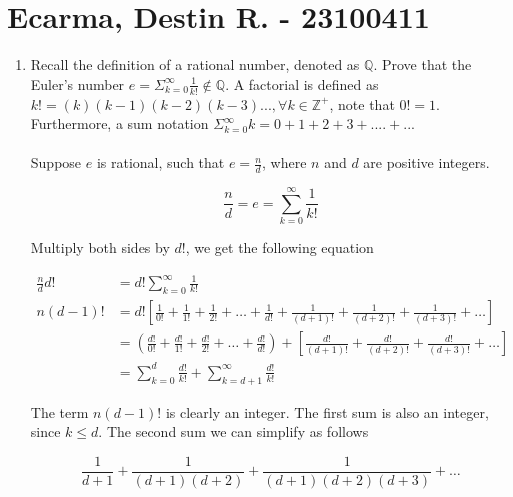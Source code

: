 \documentclass{article}
\begin{document}
\section*{Ecarma, Destin R. - 23100411}
\boldmath

\begin{enumerate}
	\item Recall the definition of a rational number, denoted as $\mathbb{Q}$. Prove that the Euler's number $e = \Sigma_{k=0}^\infty \frac{1}{k!} \notin \mathbb{Q}$. A factorial is defined as $k! = (k)(k-1)(k-2)(k-3)..., \forall k \in \mathbb{Z}^+$, note that $0! = 1$. Furthermore, a sum notation $\Sigma_{k=0}^\infty k = 0+ 1 + 2 + 3 +....+...$
	      \\~\\
	      Suppose $e$ is rational, such that $e = \frac{n}{d}$, where $n$ and $d$ are positive integers.

	      \begin{equation}
		      \frac{n}{d} = e = \sum_{k=0}^{\infty} \frac{1}{k!}
	      \end{equation}

	      Multiply both sides by $d!$, we get the following equation

	      \begin{equation}
		      \begin{split}
			      \frac{n}{d}d! & = d!\sum_{k=0}^{\infty} \frac{1}{k!}                                                                                                                                         \\
			      n(d - 1)!     & = d! \left[\frac{1}{0!} + \frac{1}{1!} + \frac{1}{2!} + \dots + \frac{1}{d!} + \frac{1}{(d+1)!} + \frac{1}{(d+2)!} + \frac{1}{(d+3)!} + \dots \right]                        \\
			                    & = \left(\frac{d!}{0!} + \frac{d!}{1!} + \frac{d!}{2!} + \dots + \frac{d!}{d!}\right) + \left[\frac{d!}{(d + 1)!}  + \frac{d!}{(d + 2)!} + \frac{d!}{(d + 3)!} + \dots\right] \\
			                    & = \sum_{k=0}^{d} \frac{d!}{k!} + \sum_{k=d+1}^{\infty} \frac{d!}{k!}
		      \end{split}
	      \end{equation}

	      The term $n(d - 1)!$ is clearly an integer. The first sum is also an integer, since $k \leq d$. The second sum we can simplify as follows

	      \begin{equation}
		      \frac{1}{d+1} + \frac{1}{(d+1)(d+2)} + \frac{1}{(d+1)(d+2)(d+3)} + \dots
	      \end{equation}


\end{enumerate}
\end{document}

